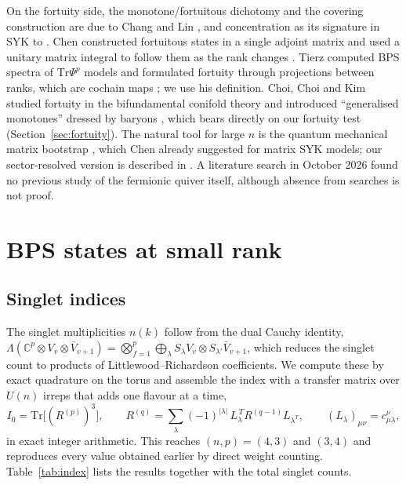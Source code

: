 \documentclass[10pt]{article}
\newcommand{\Tr}{\mathrm{Tr}}
\begin{document}
On the fortuity side, the monotone/fortuitous dichotomy and the covering construction are due to Chang and Lin
\cite{ChangLin}, and concentration as its signature in SYK to \cite{CCSY}. Chen constructed fortuitous states in a
single adjoint matrix and used a unitary matrix integral to follow them as the rank changes \cite{Chen}. Tierz
computed BPS spectra of $\Tr\Psi^p$ models and formulated fortuity through projections between ranks, which are
cochain maps \cite{Tierz}; we use his definition. Choi, Choi and Kim studied fortuity in the bifundamental conifold
theory and introduced ``generalised monotones'' dressed by baryons \cite{CCK}, which bears directly on our fortuity
test (Section~\ref{sec:fortuity}). The natural tool for large $n$ is the quantum mechanical matrix bootstrap
\cite{HHK,LZ,LM}, which Chen already suggested for matrix SYK models; our sector-resolved version is described in
\cite{R2}. A literature search in October 2026 found no previous study of the fermionic quiver itself, although
absence from searches is not proof.

\section{BPS states at small rank}\label{sec:bps}

\subsection{Singlet indices}

The singlet multiplicities $n(k)$ follow from the dual Cauchy identity,
$\Lambda(\mathbb C^p\otimes V_v\otimes\bar V_{v+1})=\bigotimes_{f=1}^p\bigoplus_\lambda S_\lambda V_v\otimes
S_{\lambda'}\bar V_{v+1}$, which reduces the singlet count to products of Littlewood--Richardson coefficients. We
compute these by exact quadrature on the torus and assemble the index with a transfer matrix over $U(n)$ irreps
that adds one flavour at a time,
\begin{equation}
I_0=\Tr\big[(R^{(p)})^3\big],\qquad R^{(q)}=\sum_\lambda(-1)^{|\lambda|}\,L_\lambda^{\,T}R^{(q-1)}L_{\lambda^T},\qquad
(L_\lambda)_{\mu\nu}=c^\nu_{\mu\lambda},
\end{equation}
in exact integer arithmetic. This reaches $(n,p)=(4,3)$ and $(3,4)$ and reproduces every value obtained earlier by
direct weight counting. Table~\ref{tab:index} lists the results together with the total singlet counts.
\end{document}
